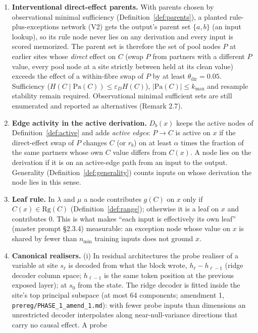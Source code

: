 \documentclass[11pt]{article}
\theoremstyle{definition}
\theoremstyle{plain}
\theoremstyle{remark}
\newcommand{\pa}{\mathrm{Pa}}
\newcommand{\Hent}{H}
\begin{document}
\begin{enumerate}[label=(M\arabic*)]
\item \textbf{Interventional direct-effect parents.} With parents chosen by
observational minimal sufficiency (Definition~\ref{def:parents}), a planted
rule-plus-exceptions network (V2) gets the output's parent set $\{a,b\}$ (an
input lookup), so its rule node never lies on any derivation and every input
is scored memorized. The parent set is therefore the set of pool nodes $P$
at earlier sites whose \emph{direct} effect on $C$ (swap $P$ from partners
with a different $P$ value, every pool node at a site strictly between held
at its clean value) exceeds the effect of a within-fibre swap of $P$ by at
least $\theta_{\mathrm{dir}}=0.05$. Sufficiency
($\Hent(C\mid\pa(C))\le\varepsilon_D\Hent(C)$), $|\pa(C)|\le k_{\max}$ and
resample stability remain required. Observational minimal sufficient sets
are still enumerated and reported as alternatives (Remark 2.7).
\item \textbf{Edge activity in the active derivation.} $D_b(x)$ keeps the
active nodes of Definition~\ref{def:active} and adds \emph{active edges}: $P\to C$ is
active on $x$ if the direct-effect swap of $P$ changes $C$ (or $r_b$) on at
least $\alpha$ times the fraction of the same partners whose own $C$ value
differs from $C(x)$. A node lies on the derivation if it is on an
active-edge path from an input to the output. Generality (Definition~\ref{def:generality})
counts inputs on whose derivation the node lies in this sense.
\item \textbf{Leaf rule.} In $\lambda$ and $\mu$ a node contributes $g(C)$ on
$x$ only if $C(x)\in\mathrm{Rg}(C)$ (Definition~\ref{def:range}); otherwise it is a
leaf on $x$ and contributes $0$. This is what makes ``each input is
effectively its own leaf'' (master prompt \S2.3.4) measurable: an exception
node whose value on $x$ is shared by fewer than $n_{\min}$ training inputs
does not ground $x$.
\item \textbf{Canonical realisers.} (i) In residual architectures the probe
realiser of a variable at site $s_\ell$ is decoded from what the block wrote,
$h_\ell-h_{\ell-1}$ (ridge decoder column space; $h_{\ell-1}$ is the same token
position at the previous exposed layer); at $s_0$ from the state. The ridge decoder is fitted inside the site's top principal subspace (at most
64 components; amendment 1, \texttt{prereg/PHASE\_1\_amend\_1.md}): with fewer
probe inputs than dimensions an unrestricted decoder interpolates along
near-null-variance directions that carry no causal effect. A probe

\end{enumerate}
\end{document}
